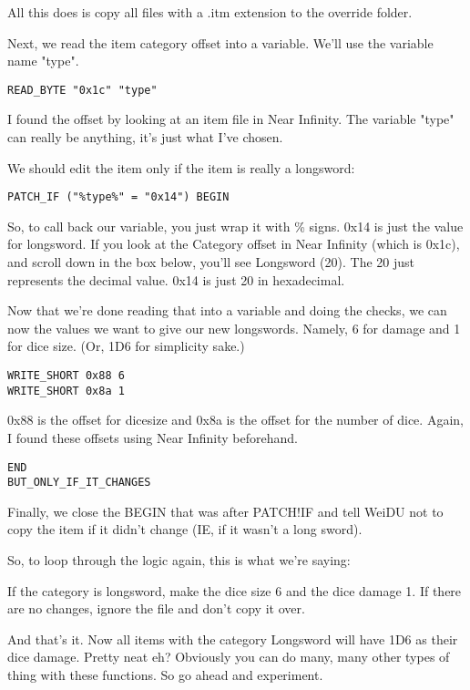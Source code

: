 \documentclass{article}
\def\ttref#1{\ahrefloc{#1}{\tt #1}}
\begin{document}
All this does is copy all files with a .itm extension to the override folder.

Next, we read the item category offset into a variable. We'll use the variable 
name "type".

\begin{verbatim}
READ_BYTE "0x1c" "type"
\end{verbatim}

I found the offset by looking at an item file in Near Infinity. The
variable "type" can really be anything, it's just what I've chosen.

We should edit the item only if the item is really a longsword:

\begin{verbatim}
PATCH_IF ("%type%" = "0x14") BEGIN
\end{verbatim}

So, to call back our variable, you just wrap it with \% signs. 0x14 is just
the value for longsword. If you look at the Category offset in Near
Infinity (which is 0x1c), and scroll down in the box below, you'll see
Longsword (20).  The 20 just represents the decimal value. 0x14 is just 20
in hexadecimal.

Now that we're done reading that into a variable and doing the checks, we can now
\ttref{WRITE!SHORT} the values we want to give our new longswords. Namely,
6 for damage and 1 for dice size. (Or, 1D6 for simplicity sake.)

\begin{verbatim}
WRITE_SHORT 0x88 6
WRITE_SHORT 0x8a 1
\end{verbatim}

0x88 is the offset for dicesize and 0x8a is the offset for the number of
dice.  Again, I found these offsets using Near Infinity beforehand.

\begin{verbatim}
END
BUT_ONLY_IF_IT_CHANGES
\end{verbatim}

Finally, we close the BEGIN that was after PATCH!IF and tell WeiDU not to copy
the item if it didn't change (IE, if it wasn't a long sword).

So, to loop through the logic again, this is what we're saying:

If the category is longsword, make the dice size 6 and the dice damage 1. If 
there are no changes, ignore the file and don't copy it over.

And that's it. Now all items with the category Longsword will have 1D6 as their 
dice damage. Pretty neat eh? Obviously you can do many, many other types of 
thing with these functions. So go ahead and experiment.
\end{document}

